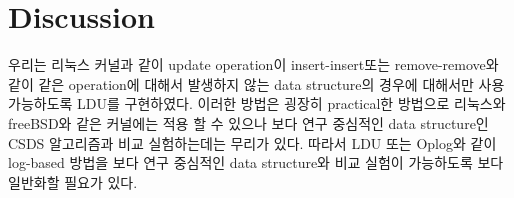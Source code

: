 \section{Discussion}

\ifkor
우리는 리눅스 커널과 같이 update operation이 insert-insert또는 remove-remove와 같이 같은 operation에
대해서 발생하지 않는 data structure의 경우에 대해서만 사용 가능하도록 LDU를 구현하였다.
이러한 방법은 굉장히 practical한 방법으로 리눅스와 freeBSD와 같은 커널에는 적용 할 수 있으나 
보다 연구 중심적인 data structure인 CSDS 알고리즘과 비교 실험하는데는 무리가 있다. 
따라서 LDU 또는 Oplog와 같이 log-based 방법을 보다 연구 중심적인 data structure와 비교 실험이
가능하도록 보다 일반화할 필요가 있다. 
\else

\fi







